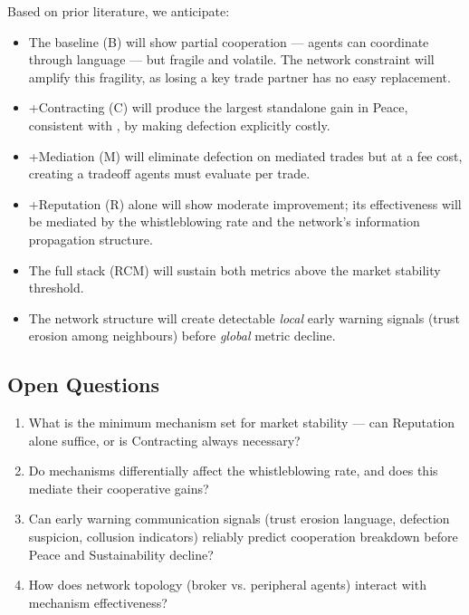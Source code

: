 \documentclass[12pt, a4paper]{article}
\newcommand{\placeholder}[1]{%
  \begin{figure}[H]
    \centering
    \fbox{%
      \begin{minipage}{0.85\textwidth}
        \centering\vspace{1.5cm}
        \textcolor{gray}{\textit{[PLACEHOLDER: #1]}}
        \vspace{1.5cm}
      \end{minipage}%
    }
  \end{figure}%
}
\begin{document}
Based on prior literature, we anticipate:

\begin{itemize}
  \item The baseline (B) will show partial cooperation — agents can coordinate through language — but fragile and volatile. The network constraint will amplify this fragility, as losing a key trade partner has no easy replacement.
  \item +Contracting (C) will produce the largest standalone gain in Peace, consistent with \citet{coopeval}, by making defection explicitly costly.
  \item +Mediation (M) will eliminate defection on mediated trades but at a fee cost, creating a tradeoff agents must evaluate per trade.
  \item +Reputation (R) alone will show moderate improvement; its effectiveness will be mediated by the whistleblowing rate and the network's information propagation structure.
  \item The full stack (RCM) will sustain both metrics above the market stability threshold.
  \item The network structure will create detectable \textit{local} early warning signals (trust erosion among neighbours) before \textit{global} metric decline.
\end{itemize}

\subsection{Open Questions}

\begin{enumerate}
  \item What is the minimum mechanism set for market stability — can Reputation alone suffice, or is Contracting always necessary?
  \item Do mechanisms differentially affect the whistleblowing rate, and does this mediate their cooperative gains?
  \item Can early warning communication signals (trust erosion language, defection suspicion, collusion indicators) reliably predict cooperation breakdown before Peace and Sustainability decline?
  \item How does network topology (broker vs. peripheral agents) interact with mechanism effectiveness?
\end{enumerate}

\placeholder{Figure: Mechanism comparison chart. Suggested: axes = Sustainability, Peace; one data point per condition. Visual summary of which mechanism dominates on which dimension.}
\end{document}
